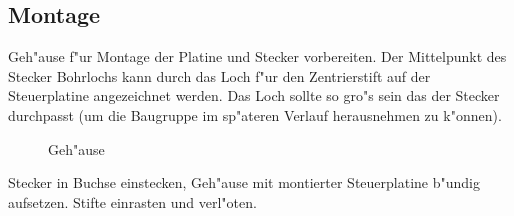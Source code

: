 \documentclass[ngerman,11pt,parskip=half] {scrartcl}
\begin{document}
\subsection{Montage} \label{sec:aufbau:montage}

Geh"ause f"ur Montage der Platine und Stecker vorbereiten. Der Mittelpunkt des Stecker Bohrlochs kann durch das Loch f"ur den Zentrierstift auf der Steuerplatine angezeichnet werden. Das Loch sollte so gro"s sein das der Stecker durchpasst (um die Baugruppe im sp"ateren Verlauf herausnehmen zu k"onnen).

\begin{figure}[H]
\centering
{}
\caption{Geh"ause} \label{fig:1}
\end{figure}

Stecker in Buchse einstecken, Geh"ause mit montierter Steuerplatine b"undig aufsetzen. Stifte einrasten und verl"oten.
\end{document}
